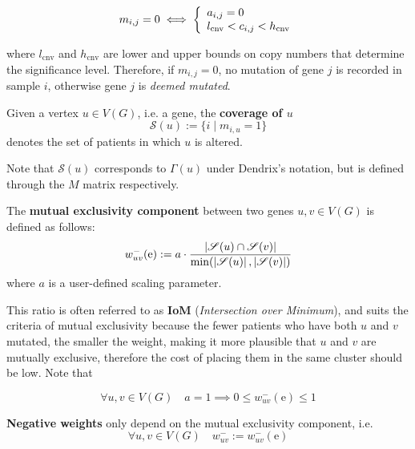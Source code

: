 \begin{equation}
    m_{i, j} = 0 \iff \soe{l}{a_{i, j} = 0 \\ l_{\mathrm{cnv}} < c_{i, j} < h_{\mathrm{cnv}}}
\end{equation}

where $l_{\mathrm{cnv}}$ and $h_{\mathrm{cnv}}$ are lower and upper bounds on copy numbers that determine the significance level.  Therefore, if $m_{i, j} = 0$, no mutation of gene $j$ is recorded in sample $i$, otherwise gene $j$ is \textit{deemed mutated}.

\begin{definition}
    Given a vertex $u \in V(G)$, i.e. a gene, the \textbf{coverage of $u$} $$\mathscr{S}(u) := \{i \mid m_{i, u} = 1\}$$ denotes the set of patients in which $u$ is altered.
\end{definition}

Note that $\mathscr{S}(u)$ corresponds to $\Gamma(u)$ under Dendrix's notation, but is defined through the $M$ matrix respectively.

\begin{definition} \label{me_comp}
    The \textbf{mutual exclusivity component} between two genes $u, v \in V(G)$ is defined as follows: $$w_{uv}^-(\mathrm e) := a \cdot \dfrac{\abs{\mathscr{S}(u) \cap \mathscr{S}(v)}}{\min(\abs{\mathscr{S}(u)}, \abs{\mathscr{S}(v)})}$$ where $a$ is a user-defined scaling parameter.
\end{definition}

This ratio is often referred to as \textbf{IoM} (\textit{Intersection over Minimum}), and suits the criteria of mutual exclusivity because the fewer patients who have both $u$ and $v$ mutated, the smaller the weight, making it more plausible that $u$ and $v$ are mutually exclusive, therefore the cost of placing them in the same cluster should be low. Note that

\begin{equation}\label{neg_weight_constraint}
    \forall u, v \in V(G) \quad a = 1 \implies 0 \le w_{uv}^-(\mathrm e) \le 1
\end{equation}

\begin{definition} \label{neg_weights}
    \textbf{Negative weights} only depend on the mutual exclusivity component, i.e. $$\forall u, v \in V(G) \quad w_{uv}^- := w_{uv}^-(\mathrm e)$$
\end{definition}

